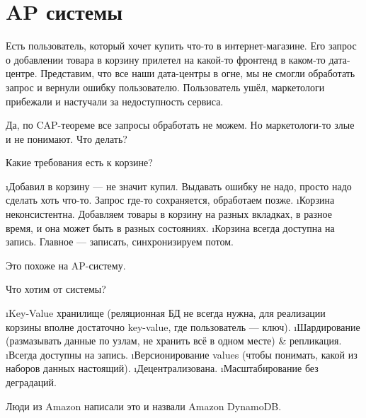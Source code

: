 \section{AP системы}
Есть пользователь, который хочет купить что-то в интернет-магазине. Его запрос о добавлении товара в корзину прилетел на какой-то фронтенд в каком-то дата-центре. Представим, что все наши дата-центры в огне, мы не смогли обработать запрос и вернули ошибку пользователю. Пользователь ушёл, маркетологи прибежали и настучали за недоступность сервиса. 

Да, по CAP-теореме все запросы обработать не можем. Но маркетологи-то злые и не понимают. Что делать?

Какие требования есть к корзине?
\begin{enumerate}
\i Добавил в корзину --- не значит купил. Выдавать ошибку не надо, просто надо сделать хоть что-то. Запрос где-то сохраняется, обработаем позже.
\i Корзина неконсистентна. Добавляем товары в корзину на разных вкладках, в разное время, и она может быть в разных состояниях.
\i Корзина всегда доступна на запись. Главное --- записать, синхронизируем потом.
\end{enumerate}
Это похоже на AP-систему.

Что хотим от системы?
\begin{enumerate}
\i Key-Value хранилище (реляционная БД не всегда нужна, для реализации корзины вполне достаточно key-value, где пользователь --- ключ).
\i Шардирование (размазывать данные по узлам, не хранить всё в одном месте) \& репликация.
\i Всегда доступны на запись.
\i Версионирование values (чтобы понимать, какой из наборов данных настоящий).
\i Децентрализована.
\i Масштабирование без деградаций.
\end{enumerate}

Люди из Amazon написали это и назвали Amazon DynamoDB.

